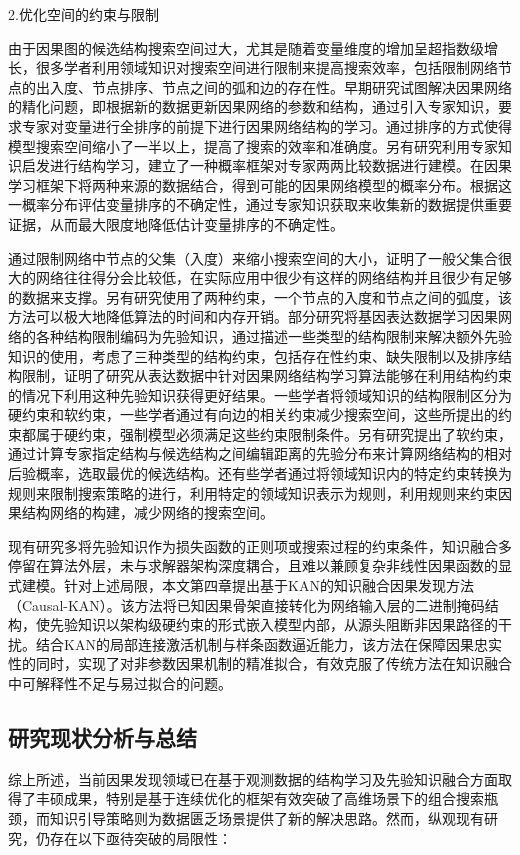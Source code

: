 {\hei 2.优化空间的约束与限制}

由于因果图的候选结构搜索空间过大，尤其是随着变量维度的增加呈超指数级增长，很多学者利用领域知识对搜索空间进行限制来提高搜索效率，包括限制网络节点的出入度、节点排序、节点之间的弧和边的存在性。早期研究试图解决因果网络的精化问题，即根据新的数据更新因果网络的参数和结构，通过引入专家知识，要求专家对变量进行全排序的前提下进行因果网络结构的学习。通过排序的方式使得模型搜索空间缩小了一半以上，提高了搜索的效率和准确度。另有研究利用专家知识启发进行结构学习，建立了一种概率框架对专家两两比较数据进行建模\cite{Langseth2003}。在因果学习框架下将两种来源的数据结合，得到可能的因果网络模型的概率分布。根据这一概率分布评估变量排序的不确定性，通过专家知识获取来收集新的数据提供重要证据，从而最大限度地降低估计变量排序的不确定性。

通过限制网络中节点的父集（入度）来缩小搜索空间的大小，证明了一般父集合很大的网络往往得分会比较低，在实际应用中很少有这样的网络结构并且很少有足够的数据来支撑\cite{Friedman2013}。另有研究使用了两种约束，一个节点的入度和节点之间的弧度，该方法可以极大地降低算法的时间和内存开销\cite{DeCampos2009}。部分研究将基因表达数据学习因果网络的各种结构限制编码为先验知识，通过描述一些类型的结构限制来解决额外先验知识的使用，考虑了三种类型的结构约束，包括存在性约束、缺失限制以及排序结构限制，证明了研究从表达数据中针对因果网络结构学习算法能够在利用结构约束的情况下利用这种先验知识获得更好结果\cite{De2019}。一些学者将领域知识的结构限制区分为硬约束和软约束，一些学者通过有向边的相关约束减少搜索空间，这些所提出的约束都属于硬约束，强制模型必须满足这些约束限制条件\cite{Wu2015}。另有研究提出了软约束，通过计算专家指定结构与候选结构之间编辑距离的先验分布来计算网络结构的相对后验概率，选取最优的候选结构\cite{Heckerman1995}。还有些学者通过将领域知识内的特定约束转换为规则来限制搜索策略的进行，利用特定的领域知识表示为规则，利用规则来约束因果结构网络的构建，减少网络的搜索空间\cite{赵建喆2020}。

现有研究多将先验知识作为损失函数的正则项或搜索过程的约束条件，知识融合多停留在算法外层，未与求解器架构深度耦合，且难以兼顾复杂非线性因果函数的显式建模。针对上述局限，本文第四章提出基于KAN的知识融合因果发现方法（Causal-KAN）。该方法将已知因果骨架直接转化为网络输入层的二进制掩码结构，使先验知识以架构级硬约束的形式嵌入模型内部，从源头阻断非因果路径的干扰。结合KAN的局部连接激活机制与样条函数逼近能力，该方法在保障因果忠实性的同时，实现了对非参数因果机制的精准拟合，有效克服了传统方法在知识融合中可解释性不足与易过拟合的问题。

\subsection{研究现状分析与总结}
\label{研究现状分析与总结}
综上所述，当前因果发现领域已在基于观测数据的结构学习及先验知识融合方面取得了丰硕成果，特别是基于连续优化的框架有效突破了高维场景下的组合搜索瓶颈，而知识引导策略则为数据匮乏场景提供了新的解决思路。然而，纵观现有研究，仍存在以下亟待突破的局限性：

